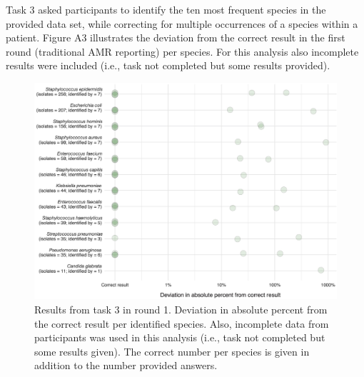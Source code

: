 \documentclass[
]{book}
\begin{document}
Task 3 asked participants to identify the ten most frequent species in the provided data set, while correcting for multiple occurrences of a species within a patient. Figure A3 illustrates the deviation from the correct result in the first round (traditional AMR reporting) per species. For this analysis also incomplete results were included (i.e., task not completed but some results provided).

\begin{figure}

{\centering \includegraphics[width=1\linewidth]{images/06-a03} 

}

\caption{Results from task 3 in round 1. Deviation in absolute percent from the correct result per identified species. Also, incomplete data from participants was used in this analysis (i.e., task not completed but some results given). The correct number per species is given in addition to the number provided answers.}\label{fig:fig6-a1}
\end{figure}

  
\end{document}
